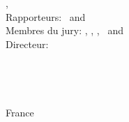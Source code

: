 \hfill
\vfill
{\small
\textbf{\thesisName} \\
\textit{\thesisTitleFr} \\
\thesisSubjectFr, \thesisDateFr \\
Rapporteurs: \thesisFirstReviewer\ and \thesisSecondReviewer \\
Membres du jury: \thesisPresident, \thesisFirstReviewer, \thesisSecondReviewer, \thesisExaminator\ and \thesisFirstSupervisor\\
Directeur: \thesisFirstSupervisor\\[1.5em]
\textbf{\thesisUniversity} \\
\thesisUniversityDepartment \\
\thesisUniversityStreetAddress \\
\thesisUniversityPostalCode\ \thesisUniversityCity\\
France
}

